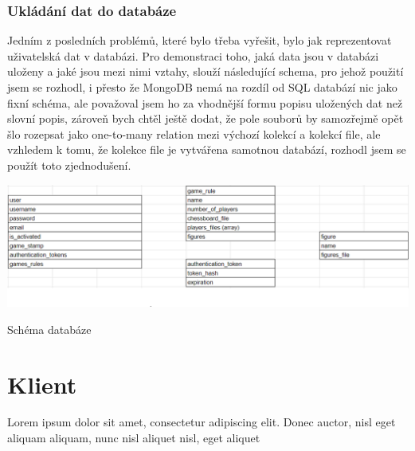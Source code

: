 \documentclass[12pt]{article}
\begin{document}
\subsubsection{Ukládání dat do databáze}
Jedním z posledních problémů, které bylo třeba vyřešit, bylo jak reprezentovat uživatelská dat v databázi. Pro demonstraci toho, jaká data jsou v databázi uloženy a jaké jsou mezi nimi vztahy, slouží následující schema, pro jehož použití jsem se rozhodl, i přesto že MongoDB nemá na rozdíl od SQL databází nic jako fixní schéma, ale považoval jsem ho za vhodnější formu popisu uložených dat než slovní popis, zároveň bych chtěl ještě dodat, že pole souborů by samozřejmě opět šlo rozepsat jako one-to-many relation mezi výchozí kolekcí a kolekcí file, ale vzhledem k tomu, že kolekce file je vytvářena samotnou databází, rozhodl jsem se použít toto zjednodušení.
\begin{listing}[!ht]
 \includegraphics[scale=0.75, width=15cm]{pictures/schem.png}\par
\caption{Schéma databáze}
\end{listing}
\newpage
\section{Klient}
Lorem ipsum dolor sit amet, consectetur adipiscing elit. Donec auctor, nisl eget aliquam aliquam, nunc nisl aliquet nisl, eget aliquet
\newpage
\printbibliography[heading=bibintoc,title={Reference}]
\newpage
{}
\listoflistings
\end{document}
